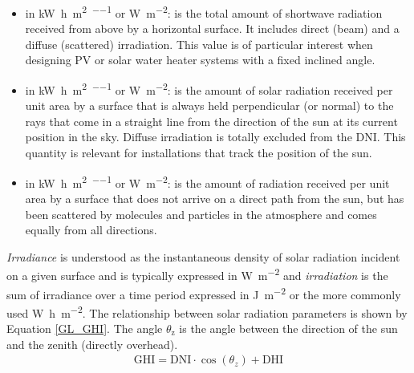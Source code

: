 \begin{itemize}
\item \textbf{} in \si{\kilo\watt\hour\per\square\metre\per\year} or \si{\watt\per\square\metre}:  is the total amount of shortwave radiation received from above by a horizontal surface. It includes direct (beam) and a diffuse (scattered) irradiation. This value is of particular interest when designing PV or solar water heater systems with a fixed inclined angle.
\item \textbf{} in \si{\kilo\watt\hour\per\square\metre\per\year} or \si{\watt\per\square\metre}:  is the amount of solar radiation received per unit area by a surface that is always held perpendicular (or normal) to the rays that come in a straight line from the direction of the sun at its current position in the sky. Diffuse irradiation is totally excluded from the DNI. This quantity is relevant for installations that track the position of the sun.
\item \textbf{} in \si{\kilo\watt\hour\per\square\metre\per\year} or \si{\watt\per\square\metre}:  is the amount of radiation received per unit area by a surface that does not arrive on a direct path from the sun, but has been scattered by molecules and particles in the atmosphere and comes equally from all directions.
\end{itemize}
\emph{Irradiance} is understood as the instantaneous density of solar radiation incident on a given surface and is typically expressed in \si{\watt\per\square\metre} and \emph{irradiation} is the sum of irradiance over a time period expressed in \si{\joule\per\square\metre} or the more commonly used \si{\watt\hour\per\square\metre}. The relationship between solar radiation parameters is shown by Equation \ref{GL_GHI}. The angle $\theta_\text{z}$ is the angle between the direction of the sun and the zenith (directly overhead).
\begin{align}
\text{GHI}=\text{DNI}\cdot\cos(\theta_{z})+\text{DHI}\label{GL_GHI}
\end{align}

